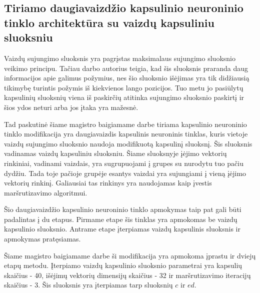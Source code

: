 \subsection{Tiriamo daugiavaizdžio kapsulinio neuroninio tinklo architektūra su vaizdų kapsuliniu sluoksniu}

Vaizdų sujungimo sluoksnis yra pagrįstas maksimalaus sujungimo sluoksnio veikimo principu. Tačiau darbo \cite{capsNet} autorius teigia, kad šis sluoksnis praranda daug informacijos apie galimus požymius, nes šio sluoksnio išėjimas yra tik didžiausią tikimybę turintis požymis iš kiekvienos lango pozicijos. Tuo metu jo pasiūlytų kapsulinių sluoksnių viena iš paskirčių atitinka sujungimo sluoksnio paskirtį ir šios ydos neturi arba jos įtaka yra mažesnė.

Tad paskutinė šiame magistro baigiamame darbe tiriama kapsulinio neuroninio tinklo modifikacija yra daugiavaizdis kapsulinis neuroninis tinklas, kuris vietoje vaizdų sujungimo sluoksnio naudoja modifikuotą kapsulinį sluoksnį. Šis sluoksnis vadinamas vaizdų kapsuliniu sluoksniu. Šiame sluoksnyje įėjimo vektorių rinkiniai, vadinami vaizdais, yra sugrupuojami į grupes su nurodytu tuo pačiu dydžiu. Tada toje pačioje grupėje esantys vaizdai yra sujungiami į vieną įėjimo vektorių rinkinį. Galiausiai tas rinkinys yra naudojamas kaip įvestis maršrutizavimo algoritmui.

Šio daugiavaizdžio kapsulinio neuroninio tinklo apmokymas taip pat gali būti padalintas į du etapus. Pirmame etape šis tinklas yra apmokomas be vaizdų kapsulinio sluoksnio. Antrame etape įterpiamas vaizdų kapsulinis sluoksnis ir apmokymas pratęsiamas.

Šiame magistro baigiamame darbe ši modifikacija yra apmokoma įprastu ir dviejų etapų metodu. Įterpiamo vaizdų kapsulinio sluoksnio parametrai yra kapsulių skaičius - 40, išėjimų vektorių dimensijų skaičius - 32 ir maršrutizavimo iteracijų skaičius - 3. Šis sluoksnis yra įterpiamas tarp sluoksnių $c$ ir $ed$.

